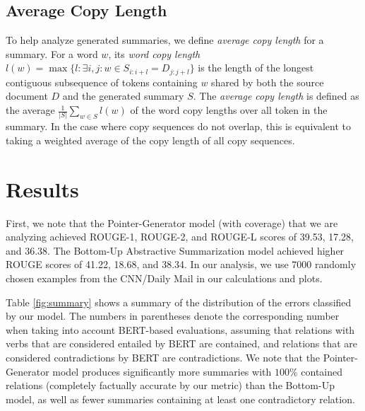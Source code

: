 \documentclass{article}
\begin{document}
\subsection{Average Copy Length}
\label{copy-length}
To help analyze generated summaries, we define \textit{average copy length} for a summary. For a word $w$, its \textit{word copy length} $l(w) = \max \{l : \exists i,j : w \in S_{i:i+l} = D_{j:j+l} \}$ is the length of the longest contiguous subsequence of tokens containing $w$ shared by both the source document $D$ and the generated summary $S$. The \textit{average copy length} is defined as the average $\frac{1}{|S|} \sum_{w\in S} l(w)$ of the word copy lengths over all token in the summary. In the case where copy sequences do not overlap, this is equivalent to taking a weighted average of the copy length of all copy sequences.

\pagebreak
\section{Results}
\label{sec:results}
First, we note that the Pointer-Generator model (with coverage) that we are analyzing achieved ROUGE-1, ROUGE-2, and ROUGE-L scores of 39.53, 17.28, and 36.38. The Bottom-Up Abstractive Summarization model achieved higher ROUGE scores of 41.22, 18.68, and 38.34. In our analysis, we use 7000 randomly chosen examples from the CNN/Daily Mail in our calculations and plots.

Table \ref{fig:summary} shows a summary of the distribution of the errors classified by our model. The numbers in parentheses denote the corresponding number when taking into account BERT-based evaluations, assuming that relations with verbs that are considered entailed by BERT are contained, and relations that are considered contradictions by BERT are contradictions. We note that the Pointer-Generator model produces significantly more summaries with $100\%$ contained relations (completely factually accurate by our metric) than the Bottom-Up model, as well as fewer summaries containing at least one contradictory relation.
\end{document}
